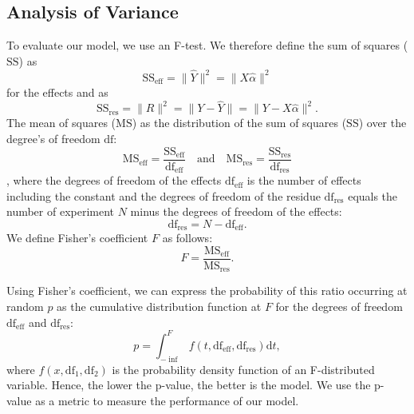 \subsection{Analysis of Variance}
To evaluate our model, we use an F-test. We therefore define the sum of squares ($\text{SS}$) as
\begin{equation}
	\text{SS}_\text{eff} = \| \hat{Y} \|^2 = \| X \hat{\alpha} \|^2
\end{equation}
for the effects and as
\begin{equation}
	\text{SS}_\text{res} = \| R \|^2 = \| Y - \hat{Y} \| = \| Y - X \hat{\alpha} \|^2.
\end{equation}
The mean of squares ($\text{MS}$) as the distribution of the sum of squares ($\text{SS}$) over the degree's of freedom $\text{df}$:
\begin{equation}
	\text{MS}_\text{eff} = \frac{\text{SS}_\text{eff}}{\text{df}_\text{eff}} \quad \text{and} \quad 
	\text{MS}_\text{res} = \frac{\text{SS}_\text{res}}{\text{df}_\text{res}}
\end{equation},
where the degrees of freedom of the effects $\text{df}_\text{eff}$ is the number of effects including the constant and the degrees of freedom of the residue $\text{df}_\text{res}$ equals the number of experiment $N$ minus the degrees of freedom of the effects:
\begin{equation}
\text{df}_\text{res} = N - \text{df}_\text{eff}.
\end{equation}
We define Fisher's coefficient $F$ as follows:
\begin{equation}
F = \frac{\text{MS}_\text{eff}}{\text{MS}_\text{res}}.
\end{equation}

Using Fisher's coefficient, we can express the probability of this ratio occurring at random $p$ as the cumulative distribution function at $F$ for the degrees of freedom $\text{df}_\text{eff}$ and $\text{df}_\text{res}$:
\begin{equation}
	p = \int_{-\inf}^F f(t,\text{df}_\text{eff},\text{df}_\text{res}) \mathrm{d}t,
\end{equation}
where $f(x,\text{df}_1,\text{df}_2)$ is the probability density function of an F-distributed variable. Hence, the lower the p-value, the better is the model. We use the p-value as a metric to measure the performance of our model.